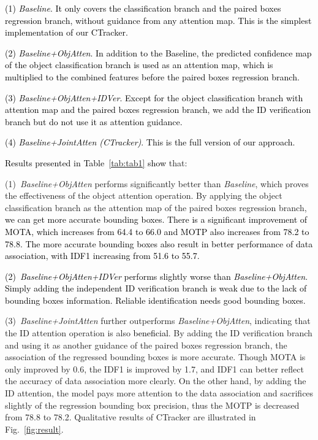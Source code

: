 \documentclass[../arXiv_main.tex]{subfiles}
\newcommand\wca[1]{\textcolor{black}{#1}}
\newcommand\wfb[1]{\textcolor{black}{#1}}
\newcommand\CRpjl[1]{\textcolor{black}{#1}}
\newcommand{\CRyang}[1]{\textcolor{black}{#1}}
\begin{document}
\noindent\wca{(1) \emph{Baseline}. \CRyang{It only covers the classification branch} and the paired boxes regression branch, without guidance from any attention map. This is the simplest implementation of our CTracker.}

\noindent\wca{(2) \emph{Baseline+ObjAtten}. \CRyang{In addition to the Baseline, the} predicted confidence map of the object classification branch is used as an attention map, which is multiplied to the combined features before the paired boxes regression branch.}

\noindent\CRpjl{(3) \emph{Baseline+ObjAtten+IDVer}. Except for the object classification branch with attention map and the paired boxes regression branch, we add the ID verification branch but do not use it as attention guidance.}

\noindent\wca{(4) \emph{Baseline+JointAtten (CTracker)}. This is the \CRyang{full} version of our approach.} 

\CRyang{Results presented in Table~\ref{tab:tab1} show} that:

(1)~\emph{Baseline+ObjAtten} performs significantly better than \emph{Baseline}, which proves the effectiveness of the object attention operation. By applying the object classification branch as the attention map of the paired boxes regression branch, \wfb{we can get more accurate bounding boxes. There is a significant improvement of MOTA, which increases from 64.4 to 66.0 and MOTP also increases from 78.2 to 78.8. The more accurate bounding boxes also result in better performance of data association, with IDF1 increasing from 51.6 to 55.7.}

\CRpjl{(2)~\emph{Baseline+ObjAtten+IDVer} performs slightly worse than \emph{Baseline+ObjAtten}. Simply adding the independent ID verification branch is weak due to the lack of bounding boxes information. Reliable identification needs good bounding boxes.}

(3)~\emph{Baseline+JointAtten} further outperforms \emph{Baseline+ObjAtten}, indicating that the ID attention operation is also \CRyang{beneficial}. By adding the ID verification branch and using it as another guidance of the paired boxes regression branch, the association of the regressed bounding boxes is more accurate. Though MOTA is only improved by 0.6, the IDF1 is improved by 1.7, and IDF1 can better reflect the accuracy of data association more clearly. On the other hand, by adding the ID attention, the model pays more attention to the data association and sacrifices slightly of the regression bounding box precision, thus the MOTP is decreased from 78.8 to 78.2. Qualitative results of CTracker are illustrated in Fig.~\ref{fig:result}.
\end{document}
